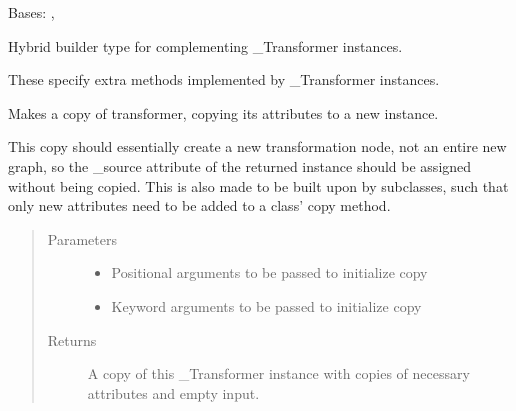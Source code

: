 \documentclass[letterpaper,10pt,english]{sphinxmanual}
\begin{document}
\begin{fulllineitems}
\label{\detokenize{dalio.pipe:dalio.pipe.pipe.PipeBuilder}}
Bases: {\hyperref[\detokenize{dalio.pipe:dalio.pipe.pipe.Pipe}]{}}, 

Hybrid builder type for complementing \_Transformer instances.

These specify extra methods implemented by \_Transformer instances.

\begin{fulllineitems}
\label{\detokenize{dalio.pipe:dalio.pipe.pipe.PipeBuilder.copy}}
Makes a copy of transformer, copying its attributes to a new
instance.

This copy should essentially create a new transformation node, not an
entire new graph, so the \_source attribute of the returned instance
should be assigned without being copied. This is also made to be built
upon by subclasses, such that only new attributes need to be added to
a class’ copy method.
\begin{quote}\begin{description}
\item[{Parameters}] \leavevmode\begin{itemize}
\item {} 
 \textendash{} Positional arguments to be passed to initialize copy

\item {} 
 \textendash{} Keyword arguments to be passed to initialize copy

\end{itemize}

\item[{Returns}] \leavevmode
A copy of this \_Transformer instance with copies of necessary
attributes and empty input.

\end{description}\end{quote}

\end{fulllineitems}


\end{fulllineitems}
\end{document}
